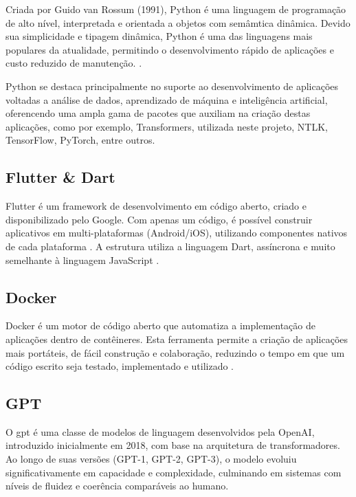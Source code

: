 Criada por Guido van Rossum (1991), Python é uma linguagem de programação de alto nível, interpretada e orientada a objetos com semâmtica dinâmica. Devido sua simplicidade e tipagem dinâmica, Python é uma das linguagens mais populares da atualidade, permitindo o desenvolvimento rápido de aplicações e custo reduzido de manutenção. \cite{VanRossum2009}.

Python se destaca principalmente no suporte ao desenvolvimento de aplicações voltadas a análise de dados, aprendizado de máquina e inteligência artificial, oferencendo uma ampla gama de pacotes que auxiliam na criação destas aplicações, como por exemplo, Transformers, utilizada neste projeto, NTLK, TensorFlow, PyTorch, entre outros.

\subsection{Flutter {\&} Dart}\label{subsec:flutterdart}

Flutter é um framework de desenvolvimento em código aberto, criado e disponibilizado pelo Google. Com apenas um código, é possível construir aplicativos em multi-plataformas (Android/iOS), utilizando componentes nativos de cada plataforma \cite{Flutter}. A estrutura utiliza a linguagem Dart, assíncrona e muito semelhante à linguagem JavaScript \cite{Dart}.

\subsection{Docker}\label{subsec:docker}

Docker é um motor de código aberto que automatiza a implementação de aplicações dentro de contêineres. Esta ferramenta permite a criação de aplicações mais portáteis, de fácil construção e colaboração, reduzindo o tempo em que um código escrito seja testado, implementado e utilizado \cite{TheDockerBook}.

\subsection{GPT}\label{subsec:gpt}

O \gls{gpt} é uma classe de modelos de linguagem desenvolvidos pela OpenAI, introduzido inicialmente em 2018, com base na arquitetura de transformadores. Ao longo de suas versões (GPT-1, GPT-2, GPT-3), o modelo evoluiu significativamente em capacidade e complexidade, culminando em sistemas com níveis de fluidez e coerência comparáveis ao humano.

